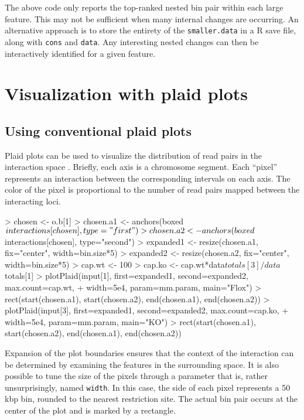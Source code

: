 \documentclass[12pt]{report}
\renewenvironment{Schunk}{\vspace{0pt}}{\vspace{0pt}}
\newcommand{\code}[1]{{\small\texttt{#1}}}
\newcommand{\R}{\textsf{R}}
\begin{document}
The above code only reports the top-ranked nested bin pair within each large feature.
This may not be sufficient when many internal changes are occurring.
An alternative approach is to store the entirety of the \code{smaller.data} in a \R{} save file, along with \code{cons} and \code{data}.
Any interesting nested changes can then be interactively identified for a given feature.

\section{Visualization with plaid plots}
\label{chap:plaid}

\subsection{Using conventional plaid plots}
Plaid plots can be used to visualize the distribution of read pairs in the interaction space \citep{lieberman2009comprehensive}. 
Briefly, each axis is a chromosome segment. 
Each ``pixel'' represents an interaction between the corresponding intervals on each axis. 
The color of the pixel is proportional to the number of read pairs mapped between the interacting loci.




\begin{Schunk}
\begin{Sinput}
> chosen <- o.b[1]
> chosen.a1 <- anchors(boxed$interactions[chosen], type="first")
> chosen.a2 <- anchors(boxed$interactions[chosen], type="second")
> expanded1 <- resize(chosen.a1, fix="center", width=bin.size*5)
> expanded2 <- resize(chosen.a2, fix="center", width=bin.size*5)
> cap.wt <- 100
> cap.ko <- cap.wt*data$totals[3]/data$totals[1]
> plotPlaid(input[1], first=expanded1, second=expanded2, max.count=cap.wt, 
+     width=5e4, param=mm.param, main="Flox")
> rect(start(chosen.a1), start(chosen.a2), end(chosen.a1), end(chosen.a2))
> plotPlaid(input[3], first=expanded1, second=expanded2, max.count=cap.ko, 
+     width=5e4, param=mm.param, main="KO")
> rect(start(chosen.a1), start(chosen.a2), end(chosen.a1), end(chosen.a2))
\end{Sinput}
\end{Schunk}


Expansion of the plot boundaries ensures that the context of the interaction can be determined by examining the features in the surrounding space. 
It is also possible to tune the size of the pixels through a parameter that is, rather unsurprisingly, named \code{width}.
In this case, the side of each pixel represents a 50 kbp bin, rounded to the nearest restriction site.
The actual bin pair occurs at the center of the plot and is marked by a rectangle.
\end{document}
